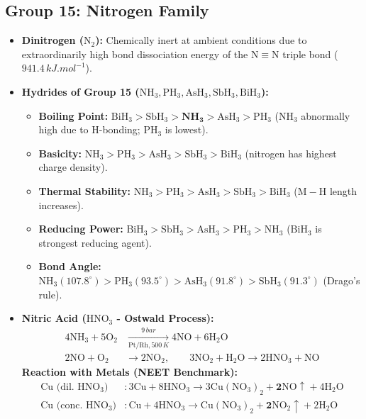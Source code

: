\documentclass[10pt,twoside,openright]{book}
\begin{document}
\subsection{Group 15: Nitrogen Family}
\begin{itemize}
  \item \textbf{Dinitrogen ($\mathrm{N_2}$):} Chemically inert at ambient conditions due to extraordinarily high bond dissociation energy of the $\mathrm{N\equiv N}$ triple bond ($941.4\,\si{kJ.mol^{-1}}$).
  \item \textbf{Hydrides of Group 15 ($\mathrm{NH_3, PH_3, AsH_3, SbH_3, BiH_3}$):}
  \begin{itemize}
    \item \textbf{Boiling Point:} $\mathrm{BiH_3 > SbH_3 > \mathbf{NH_3} > AsH_3 > PH_3}$ ($\mathrm{NH_3}$ abnormally high due to H-bonding; $\mathrm{PH_3}$ is lowest).
    \item \textbf{Basicity:} $\mathrm{NH_3} > \mathrm{PH_3} > \mathrm{AsH_3} > \mathrm{SbH_3} > \mathrm{BiH_3}$ (nitrogen has highest charge density).
    \item \textbf{Thermal Stability:} $\mathrm{NH_3} > \mathrm{PH_3} > \mathrm{AsH_3} > \mathrm{SbH_3} > \mathrm{BiH_3}$ ($\mathrm{M-H}$ length increases).
    \item \textbf{Reducing Power:} $\mathrm{BiH_3} > \mathrm{SbH_3} > \mathrm{AsH_3} > \mathrm{PH_3} > \mathrm{NH_3}$ ($\mathrm{BiH_3}$ is strongest reducing agent).
    \item \textbf{Bond Angle:} $\mathrm{NH_3} (107.8^\circ) > \mathrm{PH_3} (93.5^\circ) > \mathrm{AsH_3} (91.8^\circ) > \mathrm{SbH_3} (91.3^\circ)$ (Drago's rule).
  \end{itemize}
  \item \textbf{Nitric Acid ($\mathrm{HNO_3}$ - Ostwald Process):}
  \begin{align}
    4\mathrm{NH_3} + 5\mathrm{O_2} &\xrightarrow[\mathrm{Pt/Rh}, 500\,\si{K}]{9\,\si{bar}} 4\mathrm{NO} + 6\mathrm{H_2O} \\
    2\mathrm{NO} + \mathrm{O_2} &\longrightarrow 2\mathrm{NO_2}, \qquad 3\mathrm{NO_2} + \mathrm{H_2O} \longrightarrow 2\mathrm{HNO_3} + \mathrm{NO}
  \end{align}
  \textbf{Reaction with Metals (NEET Benchmark):}
  \begin{align}
    \text{Cu (dil. } \mathrm{HNO_3}\text{)} &: 3\mathrm{Cu} + 8\mathrm{HNO_3} \longrightarrow 3\mathrm{Cu(NO_3)_2} + \mathbf{2\mathrm{NO\uparrow}} + 4\mathrm{H_2O} \\
    \text{Cu (conc. } \mathrm{HNO_3}\text{)} &: \mathrm{Cu} + 4\mathrm{HNO_3} \longrightarrow \mathrm{Cu(NO_3)_2} + \mathbf{2\mathrm{NO_2\uparrow}} + 2\mathrm{H_2O} \\

\end{align}
\end{itemize}
\end{document}
